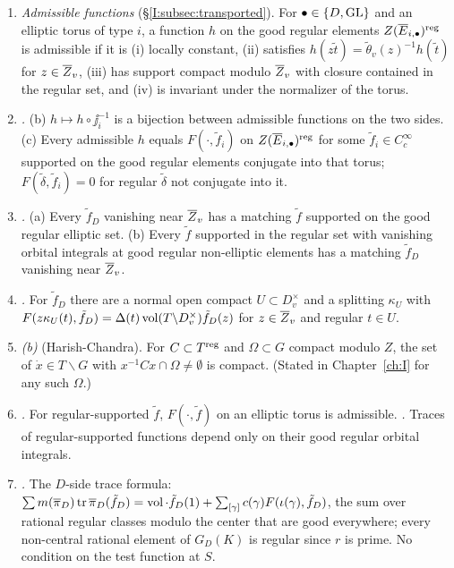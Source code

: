 \begin{enumerate}[label=(I\arabic*)]
\item \emph{Admissible functions} (\S\ref{I:subsec:transported}). For $\bullet\in\{D,\mathrm{GL}\}$ and an elliptic torus of type $i$, a function $h$ on the good regular elements $Z(\overline{E}_{i,\bullet})^{\mathrm{reg}}$ is admissible if it is (i) locally constant, (ii) satisfies $h(z\tilde t)=\tilde\theta_v(z)^{-1}h(\tilde t)$ for $z\in\overline{Z}_v$, (iii) has support compact modulo $\overline{Z}_v$ with closure contained in the regular set, and (iv) is invariant under the normalizer of the torus.
\item \emph{.} (b) $h\mapsto h\circ\jj_i^{-1}$ is a bijection between admissible functions on the two sides. (c) Every admissible $h$ equals $F(\cdot,\tilde f_i)$ on $Z(\overline{E}_{i,\bullet})^{\mathrm{reg}}$ for some $\tilde f_i\in C_c^\infty$ supported on the good regular elements conjugate into that torus; $F(\tilde\delta,\tilde f_i)=0$ for regular $\tilde\delta$ not conjugate into it.
\item \emph{.} (a) Every $\tilde f_D$ vanishing near $\overline{Z}_v$ has a matching $\tilde f$ supported on the good regular elliptic set. (b) Every $\tilde f$ supported in the regular set with vanishing orbital integrals at good regular non-elliptic elements has a matching $\tilde f_D$ vanishing near $\overline{Z}_v$.
\item \emph{.} For $\tilde f_D$ there are a normal open compact $U\subset D_v^\times$ and a splitting $\kappa_U$ with $F(z\kappa_U(t),\tilde f_D)=\Delta(t)\operatorname{vol}(T\backslash D_v^\times)\tilde f_D(z)$ for $z\in\overline{Z}_v$ and regular $t\in U$.
\item \emph{(b)} (Harish-Chandra). For $C\subset T^{\mathrm{reg}}$ and $\Omega\subset G$ compact modulo $Z$, the set of $\dot x\in T\backslash G$ with $x^{-1}Cx\cap\Omega\ne\emptyset$ is compact. (Stated in Chapter~\ref{ch:I} for any such $\Omega$.)
\item \emph{.} For regular-supported $\tilde f$, $F(\cdot,\tilde f)$ on an elliptic torus is admissible. \emph{.} Traces of regular-supported functions depend only on their good regular orbital integrals.
\item \emph{.} The $D$-side trace formula: $\sum m(\overline{\pi}_D)\operatorname{tr}\overline{\pi}_D(\tilde f_D)=\operatorname{vol}\cdot\tilde f_D(1)+\sum_{[\gamma]}c(\gamma)F(\iota(\gamma),\tilde f_D)$, the sum over rational regular classes modulo the center that are good everywhere; every non-central rational element of $G_D(K)$ is regular since $r$ is prime. No condition on the test function at $S$.

\end{enumerate}
